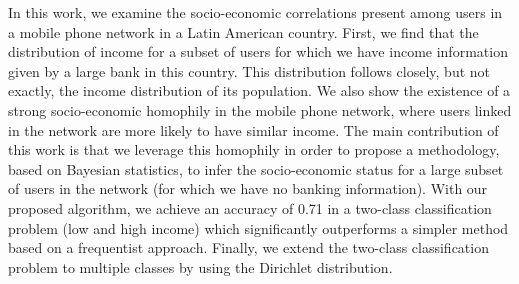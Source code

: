 In this work, we examine the socio-economic correlations present among users in a mobile phone network in a Latin American country. First, we find that the distribution of income for a subset of users for which we have income information given by a large bank in this country. This distribution follows closely, but not exactly, the income distribution of its population. We also show the existence of a strong socio-economic homophily in the mobile phone network, where users linked in the network are more likely to have similar income. The main contribution of this work is that we leverage this homophily in order to propose a methodology, based on Bayesian statistics, to infer the socio-economic status for a large subset of users in the network (for which we have no banking information). With our proposed algorithm, we achieve an accuracy of 0.71 in a two-class classification problem (low and high income) which significantly outperforms a simpler method based on a frequentist approach. Finally, we extend the two-class classification problem to multiple classes by using the Dirichlet distribution.
